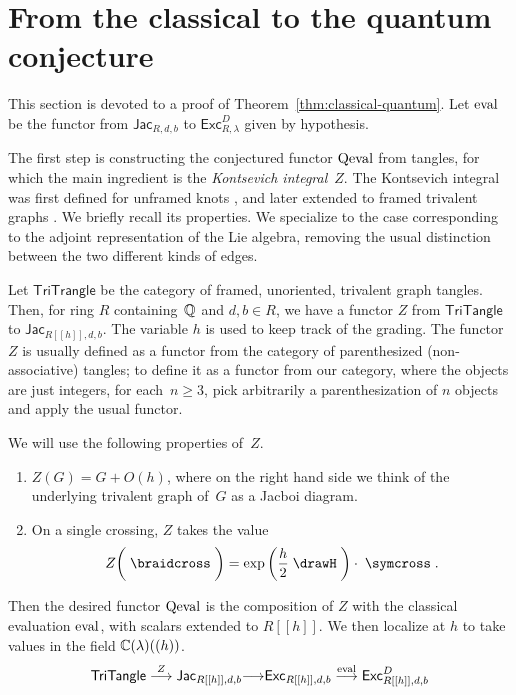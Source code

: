 \documentclass[12pt]{amsart}
\begin{document}
\section{From the classical to the quantum conjecture}
\label{sec:classical-quantum}
This section is devoted to a proof of
Theorem~\ref{thm:classical-quantum}. Let $\operatorname{eval}$ be the functor from
$\mathsf{Jac}_{R,d,b}$ to $\mathsf{Exc}^D_{R,\lambda}$ given by hypothesis.

The first step is constructing the conjectured functor $\operatorname{Qeval}$ from tangles,
for which the main ingredient is the \emph{Kontsevich integral}~$Z$. The
Kontsevich integral was first defined for unframed knots \cite{MR1318886}, and
later extended to framed trivalent graphs
\cite{MR1473309,MR2304469,MR2661529}. We briefly recall its properties. We
specialize to the case corresponding to the adjoint representation of the Lie
algebra, removing the usual distinction between the two different kinds of
edges.

Let $\mathsf{TriTrangle}$ be the category of framed, unoriented, trivalent
graph tangles.  Then, for ring
$R$ containing~$\mathbb Q$ and $d,b \in R$, we have a functor $Z$ from
$\mathsf{TriTangle}$ to $\mathsf{Jac}_{R[[h]],d,b}$. The variable $h$
is used to keep track of
the grading. The functor $Z$ is usually defined as a functor from the category of
parenthesized (non-associative) tangles; to define it as a functor from our
category, where the objects are just integers, for each~$n \ge 3$, pick
arbitrarily a parenthesization of $n$ objects and apply the usual functor.

We will use the following properties of~$Z$.
\begin{enumerate}
\item\label{item:Kontsevich-perturb} $Z(G) = G + O(h)$, where on the
  right hand side we think of the
  underlying trivalent graph of~$G$ as a Jacboi diagram.
\item\label{item:Kontsevich-crossing} On a single crossing, $Z$ takes
  the value
  \begin{equation}
    \label{eq:Kontsevich-crossing}
    Z\biggl(\;\braidcross\;\biggr) =
    \exp\left(\frac{h}{2}\;\drawH\;\right)
    \cdot\; \symcross\;.
  \end{equation}
\end{enumerate}

Then the desired functor $\operatorname{Qeval}$ is the composition of $Z$ with the
classical evaluation $\operatorname{eval}$, with scalars extended to $R[[h]]$. We
then localize at $h$ to take values in the field
$\mathbb C(\lambda)((h))$.
\[
  \mathsf{TriTangle} \overset{Z}{\longrightarrow}
  \mathsf{Jac}_{R[[h]],d,b} {\longrightarrow}
  \mathsf{Exc}_{R[[h]],d,b} \overset{\operatorname{eval}}{\longrightarrow}
  \mathsf{Exc}^D_{R[[h]],d,b}
\]
\end{document}
